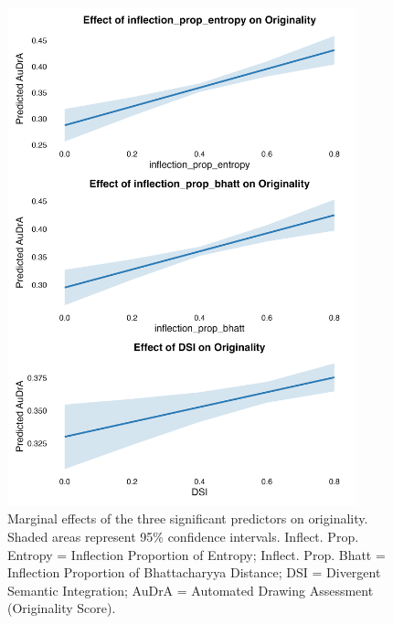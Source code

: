 \documentclass[../MA_Thesis.tex]{subfiles}
\begin{document}
\begin{figure}[H]
  \centering
  \includegraphics[height=0.85\textheight, width=0.9\textwidth]{../analysis/results/main_results/multilevel_regression/marginal_effects_plot.png}
  \caption{Marginal effects of the three significant predictors on originality. Shaded areas represent 95\% confidence intervals. Inflect. Prop. Entropy = Inflection Proportion of Entropy; Inflect. Prop. Bhatt = Inflection Proportion of Bhattacharyya Distance; DSI = Divergent Semantic Integration; AuDrA = Automated Drawing Assessment (Originality Score).}
  \label{fig:marginal_plot}
\end{figure}
\end{document}
